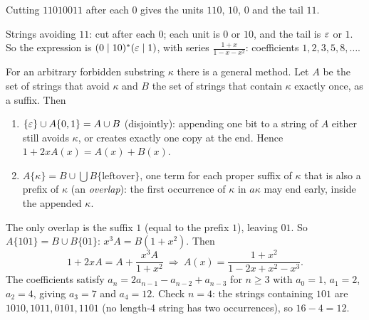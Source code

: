 \begin{center}
\end{center}
Cutting $11010011$ after each $0$ gives the units $110$, $10$, $0$ and the tail $11$.

\begin{example}
Strings avoiding $11$: cut after each $0$; each unit is $0$ or $10$, and the tail is $\varepsilon$ or
$1$. So the expression is $(0\mid10)^*(\varepsilon\mid1)$, with series $\frac{1+x}{1-x-x^2}$:
coefficients $1, 2, 3, 5, 8, \dots$.
\end{example}

For an arbitrary forbidden substring $\kappa$ there is a general method. Let $A$ be the set of
strings that avoid $\kappa$ and $B$ the set of strings that contain $\kappa$ exactly once, as a
suffix. Then
\begin{enumerate}
  \item $\{\varepsilon\} \cup A\{0,1\} = A \cup B$ (disjointly): appending one bit to a string of $A$
        either still avoids $\kappa$, or creates exactly one copy at the end. Hence
        $1 + 2xA(x) = A(x) + B(x)$.
  \item $A\{\kappa\} = B \cup \bigcup B\{\text{leftover}\}$, one term for each proper suffix of
        $\kappa$ that is also a prefix of $\kappa$ (an \emph{overlap}): the first occurrence of
        $\kappa$ in $a\kappa$ may end early, inside the appended $\kappa$.
\end{enumerate}

\begin{example}[Avoiding $101$]
The only overlap is the suffix $1$ (equal to the prefix $1$), leaving $01$. So
$A\{101\} = B \cup B\{01\}$: $x^3A = B(1 + x^2)$. Then
\[
1 + 2xA = A + \frac{x^3A}{1+x^2} \ \Longrightarrow\ A(x) = \frac{1+x^2}{1 - 2x + x^2 - x^3}.
\]
The coefficients satisfy $a_n = 2a_{n-1} - a_{n-2} + a_{n-3}$ for $n \ge 3$ with $a_0 = 1$,
$a_1 = 2$, $a_2 = 4$, giving $a_3 = 7$ and $a_4 = 12$. Check $n=4$: the strings containing
$101$ are $1010, 1011, 0101, 1101$ (no length-4 string has two occurrences), so
$16 - 4 = 12$.
\end{example}

